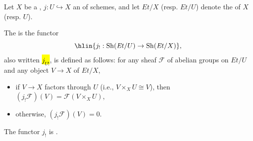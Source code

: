 \begin{definition} \label{definition:extension_by_zero_of_a_sheaf_on_the_small_etale_site_on_a_scheme_under_open_immersion}
Let $X$ be a , $j : U \hookrightarrow X$ an  of schemes, and let $\mathit{Et}/X$ (resp. $\mathit{Et}/U$) denote the  of $X$ (resp. $U$). 

The  is the functor
$$\hlin{j_! : \mathrm{Sh}(\mathit{Et}/U) \to \mathrm{Sh}(\mathit{Et}/X)},$$
also written \hl{$j_{U!}$}, is defined as follows: for any sheaf $\mathcal{F}$ of abelian groups on $\mathit{Et}/U$ and any object $V \to X$ of $\mathit{Et}/X$,
\begin{itemize}
    \item if $V \to X$ factors through $U$ (i.e., $V \times_X U \cong V$), then $(j_!\mathcal{F})(V) = \mathcal{F}(V \times_X U)$,
    \item otherwise, $(j_!\mathcal{F})(V) = 0$.
\end{itemize}
The functor $j_!$ is . 
\end{definition}